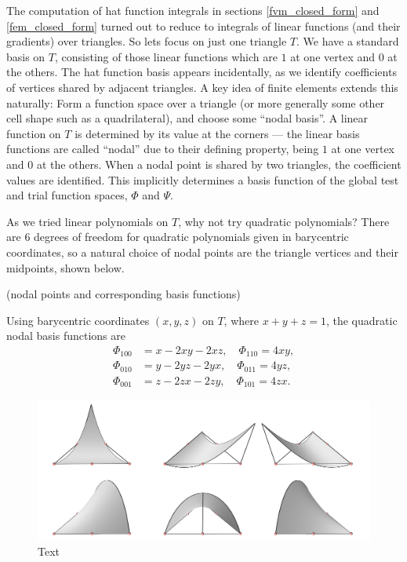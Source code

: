 The computation of hat function integrals in sections \ref{fvm_closed_form} and \ref{fem_closed_form} turned out to reduce to
integrals of linear functions (and their gradients) over triangles. So lets focus on just one triangle $T$. We have a standard basis
on $T$, consisting of those linear functions which are $1$ at one vertex and $0$ at the others. The hat function basis appears incidentally,
as we identify coefficients of vertices shared by adjacent triangles.
A key idea of finite elements extends this naturally:
Form a function space over a triangle (or more generally some other cell shape such as a quadrilateral), and choose some ``nodal basis''.
A linear function on $T$ is determined by its value at the corners --- the linear basis functions are called ``nodal'' due to their defining property,
being $1$ at one vertex and $0$ at the others. When a nodal point is shared by two triangles, the coefficient values are identified. This implicitly
determines a basis function of the global test and trial function spaces, $\Phi$ and $\Psi$.

As we tried linear polynomials on $T$, why not try quadratic polynomials? There are $6$ degrees of freedom for quadratic polynomials
given in barycentric coordinates, so a natural choice of nodal points are the triangle vertices and their midpoints, shown below.

\vskip 0.2in
(nodal points and corresponding basis functions)
\vskip 0.2in

Using barycentric coordinates $(x,y,z)$ on $T$, where $x + y + z = 1$, the quadratic nodal basis functions are
\begin{equation}\label{quadratic_nodal}
\begin{split}
    \Phi_{100} &= x - 2xy - 2xz,\quad 
    \Phi_{110} = 4xy,\\
    \Phi_{010} &= y - 2yz - 2yx,\quad
    \Phi_{011} = 4yz,\\
    \Phi_{001} &= z - 2zx - 2zy,\quad
    \Phi_{101} = 4zx.
\end{split}
\end{equation}


\begin{figure}[H]
    \begin{center}
        \includegraphics[width=1\linewidth]{figures/basis_functions/quadratic_basis.png}
    \end{center}
    \caption{\scriptsize
        Text
    }
    \label{quadratic_basis}
\end{figure}

